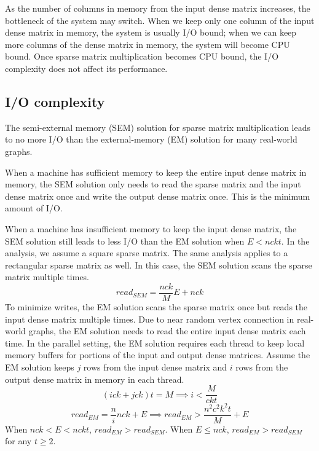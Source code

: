 As the number of columns in memory from the input dense matrix increases,
the bottleneck of the system
may switch. When we keep only one column of the input dense matrix in memory,
the system is usually I/O bound; when we can keep more columns of the dense matrix
in memory, the system will become CPU bound. Once sparse matrix multiplication
becomes CPU bound, the I/O complexity does not affect its performance.


\subsection{I/O complexity}
The semi-external memory (SEM) solution for sparse matrix multiplication leads
to no more I/O than the external-memory (EM) solution for many real-world graphs.

When a machine has sufficient memory to keep the entire input dense matrix
in memory, the SEM solution only needs to read the sparse matrix and the input
dense matrix once and write the output dense matrix once. This is
the minimum amount of I/O.

When a machine has insufficient memory to keep the input dense matrix, the SEM
solution still leads to less I/O than the EM solution when $E < n c k t$.
In the analysis, we assume a square sparse matrix. The same analysis applies
to a rectangular sparse matrix as well.
In this case, the SEM solution scans the sparse matrix multiple times.
\begin{equation*}
read_{SEM} = \frac{n c k}{M} E + n c k
\end{equation*}
To minimize writes, the EM solution
scans the sparse matrix once but reads the input dense matrix multiple times.
Due to near random vertex connection in real-world graphs, the EM solution needs to
read the entire input dense matrix each time. In the parallel setting,
the EM solution requires each thread to keep local memory buffers for portions
of the input and output dense matrices. Assume the EM solution keeps $j$ rows
from the input dense matrix and $i$ rows from the output dense matrix in memory
in each thread.
\begin{equation*}
(i c k + j c k) t = M \implies i < \frac{M}{c k t}
\end{equation*}
\begin{equation*}
read_{EM} = \frac{n}{i} n c k + E \implies  read_{EM} > \frac{n^2 c^2 k^2 t}{M} + E
\end{equation*}
When $n c k < E < n c k t$, $read_{EM} > read_{SEM}$.
When $E \leq n c k$, $read_{EM} > read_{SEM}$ for any $t \geq 2$.

